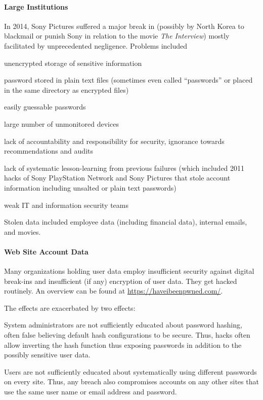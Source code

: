\paragraph{Large Institutions}
In 2014, Sony Pictures suffered a major break in (possibly by North Korea to blackmail or punish Sony in relation to the movie \emph{The Interview}) mostly facilitated by unprecedented negligence.
Problems included
\begin{compactitem}
 \item unencrypted storage of sensitive information
 \item password stored in plain text files (sometimes even called ``passwords'' or placed in the same directory as encrypted files)
 \item easily guessable passwords
 \item large number of unmonitored devices
 \item lack of accountability and responsibility for security, ignorance towards recommendations and audits
 \item lack of systematic lesson-learning from previous failures (which included 2011 hacks of Sony PlayStation Network and Sony Pictures that stole account information including unsalted or plain text passwords)
 \item weak IT and information security teams
\end{compactitem}
Stolen data included employee data (including financial data), internal emails, and movies.


\paragraph{Web Site Account Data}
Many organizations holding user data employ insufficient security against digital break-ins and insufficient (if any) encryption of user data.
They get hacked routinely.
An overview can be found at \url{https://haveibeenpwned.com/}.

The effects are exacerbated by two effects:
\begin{compactitem}
 \item System administrators are not sufficiently educated about password hashing, often false believing default hash configurations to be secure.
 Thus, hacks often allow inverting the hash function thus exposing passwords in addition to the possibly sensitive user data.
 \item Users are not sufficiently educated about systematically using different passwords on every site.
 Thus, any breach also compromises accounts on any other sites that use the same user name or email address and password.
\end{compactitem}

